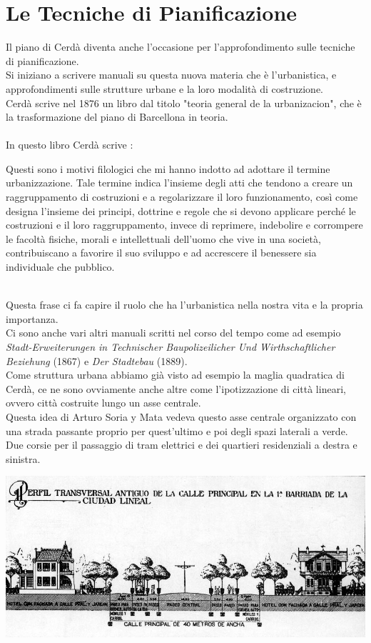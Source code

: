 \documentclass[a4paper,12pt, oneside]{book}
\begin{document}
    \section{Le Tecniche di Pianificazione}
    Il piano di Cerdà diventa anche l'occasione per l'approfondimento sulle tecniche di pianificazione.\\
    Si iniziano a scrivere manuali su questa nuova materia che è l'urbanistica, e approfondimenti sulle strutture urbane e la loro modalità di costruzione.\\
    Cerdà scrive nel 1876 un libro dal titolo "teoria general de la urbanizacion", che è la trasformazione del piano di Barcellona in teoria.\\ \\
    In questo libro Cerdà scrive : 
    \begin{displayquote}
    	Questi sono i motivi filologici che mi hanno indotto ad adottare il termine urbanizzazione. Tale termine indica l’insieme degli atti che tendono a creare un raggruppamento di costruzioni e a regolarizzare il loro funzionamento, così come designa l’insieme dei principi, dottrine e regole che si devono applicare perché le costruzioni e il loro raggruppamento, invece di reprimere, indebolire e corrompere le facoltà fisiche, morali e intellettuali dell’uomo che vive in una società, contribuiscano a favorire il suo sviluppo e ad accrescere il benessere sia individuale che pubblico.
   \end{displayquote}
   \leavevmode\\
   Questa frase ci fa capire il ruolo che ha l'urbanistica nella nostra vita e la propria importanza.\\
   Ci sono anche vari altri manuali scritti nel corso del tempo come ad esempio \textit{Stadt-Erweiterungen in Technischer Baupolizeilicher Und Wirthschaftlicher Beziehung} (1867) e \textit{Der Stadtebau} (1889).\\
   Come struttura urbana abbiamo già visto ad esempio la maglia quadratica di Cerdà, ce ne sono ovviamente anche altre come l'ipotizzazione di città lineari, ovvero città costruite lungo un asse centrale.\\
   Questa idea di Arturo Soria y Mata vedeva questo asse centrale organizzato con una strada passante proprio per quest'ultimo e poi degli spazi laterali a verde. Due corsie per il passaggio di tram elettrici e dei quartieri residenziali a destra e sinistra.\\
   \begin{center}
   	\includegraphics[width=0.8\linewidth]{"immagini/ciudad-lineal"}
   	\label{fig:Ciudad Lineal}
   \end{center}
\end{document}
